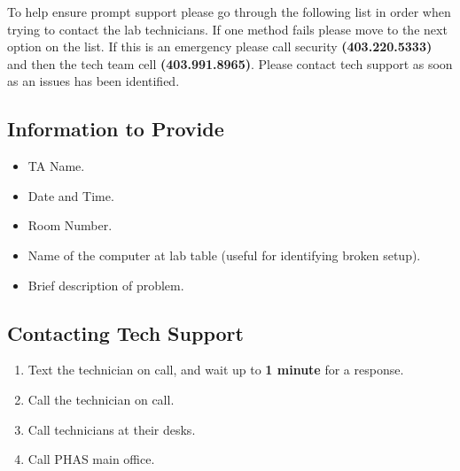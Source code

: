 \documentclass{../../../assets/LabArx-Dev} 	%
\begin{document}



\maketitle
\fancyfoot{}

To help ensure prompt support please go through the following list in order when trying to contact the lab technicians. If one method fails please move to the next option on the list. If this is an emergency please call security {\bf (403.220.5333)} and then the tech team cell {\bf (403.991.8965)}. Please contact tech support as soon as an issues has been identified.

\subsection*{Information to Provide}
\vspace{-.5cm}
\begin{itemize}[noitemsep]
\item TA Name.
\item Date and Time.
\item Room Number.
\item Name of the computer at lab table (useful for identifying broken setup).
\item Brief description of problem.
\end{itemize}
\subsection*{Contacting Tech Support}
\vspace{-.5cm}
\begin{enumerate}[noitemsep]
\item Text the technician on call, and wait up to {\bf 1 minute} for a response.
\item Call the technician on call.
\item Call technicians at their desks.
\item Call PHAS main office.
\end{enumerate}
\end{document}
